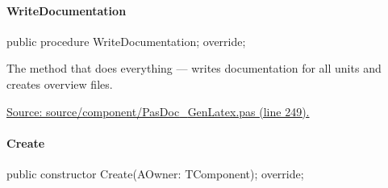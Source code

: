 \documentclass{report}
\newif\ifpdf
\begin{document}
\paragraph*{WriteDocumentation}\hspace*{\fill}

\label{PasDoc_GenLatex.TTexDocGenerator-WriteDocumentation}
\begin{list}{}{
\setlength{\itemindent}{0cm}
\setlength{\listparindent}{0cm}
\setlength{\leftmargin}{\evensidemargin}
\addtolength{\leftmargin}{\tmplength}
\settowidth{\labelsep}{X}
\addtolength{\leftmargin}{\labelsep}
\setlength{\labelwidth}{\tmplength}
}
\item[\textbf{Declaration}\hfill]
\ifpdf
\begin{flushleft}
\fi
\begin{ttfamily}
public procedure WriteDocumentation; override;\end{ttfamily}

\ifpdf
\end{flushleft}
\fi

\par
\item[\textbf{Description}]
The method that does everything --- writes documentation for all units and creates overview files.\par
\href{https://github.com/pasdoc/pasdoc/blob/master/source/component/PasDoc_GenLatex.pas#L249}{Source: source/component/PasDoc{\_}GenLatex.pas (line 249).}

\end{list}
\paragraph*{Create}\hspace*{\fill}

\label{PasDoc_GenLatex.TTexDocGenerator-Create}
\begin{list}{}{
\setlength{\itemindent}{0cm}
\setlength{\listparindent}{0cm}
\setlength{\leftmargin}{\evensidemargin}
\addtolength{\leftmargin}{\tmplength}
\settowidth{\labelsep}{X}
\addtolength{\leftmargin}{\labelsep}
\setlength{\labelwidth}{\tmplength}
}
\item[\textbf{Declaration}\hfill]
\ifpdf
\begin{flushleft}
\fi
\begin{ttfamily}
public constructor Create(AOwner: TComponent); override;\end{ttfamily}

\ifpdf
\end{flushleft}
\fi

\end{list}
\end{document}
